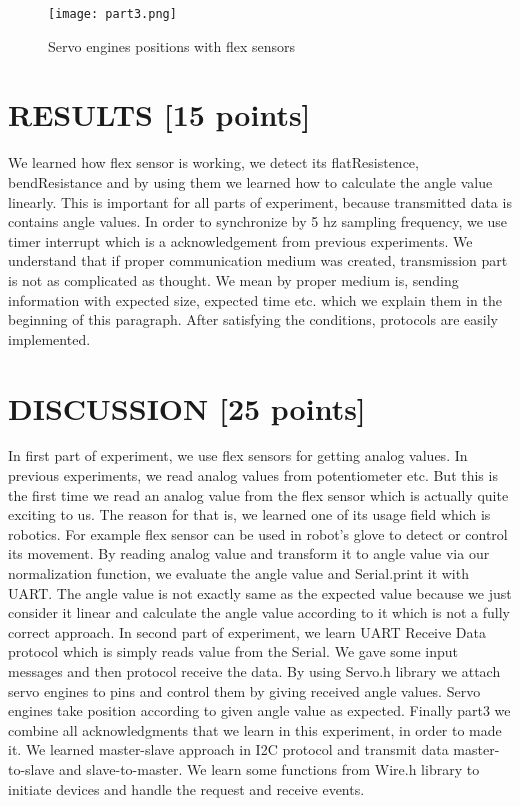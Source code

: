 \documentclass[pdftex,12pt,a4paper]{article}
\begin{document}
\begin{figure}[H]
	\centering
	\texttt{[image: part3.png]}	
	\caption{Servo engines positions with flex sensors}
	\label{fig6}
\end{figure}



\section{RESULTS [15 points]}
We learned how flex sensor is working, we detect its flatResistence, bendResistance and by using them we learned how to calculate the angle value linearly. This is important for all parts of experiment, because transmitted data is contains angle values. In order to synchronize by 5 hz sampling frequency, we use timer interrupt which is a acknowledgement from previous experiments. We understand that if proper communication medium was created, transmission part is not as complicated as thought. We mean by proper medium is, sending information with expected size, expected time etc. which we explain them in the beginning of this paragraph. After satisfying the conditions, protocols are easily implemented.


\section{DISCUSSION [25 points]}
In first part of experiment, we use flex sensors for getting analog values. In previous experiments, we read analog values from potentiometer etc. But this is the first time we read an analog value from the flex sensor which is actually quite exciting to us. The reason for that is, we learned one of its usage field which is robotics. For example flex sensor can be used in robot's glove to detect or control its movement. By reading analog value and transform it to angle value via our normalization function, we evaluate the angle value and Serial.print it with UART. The angle value is not exactly same as the expected value because we just consider it linear and calculate the angle value according to it which is not a fully correct approach. In second part of experiment, we learn UART Receive Data protocol which is simply reads value from the Serial. We gave some input messages and then protocol receive the data. By using Servo.h library we attach servo engines to pins and control them by giving received angle values. Servo engines take position according to given angle value as expected. Finally part3 we combine all acknowledgments that we learn in this experiment, in order to made it. We learned master-slave approach in I2C protocol and transmit data master-to-slave and slave-to-master. We learn some functions from Wire.h library to initiate devices and handle the request and receive events.
\end{document}
